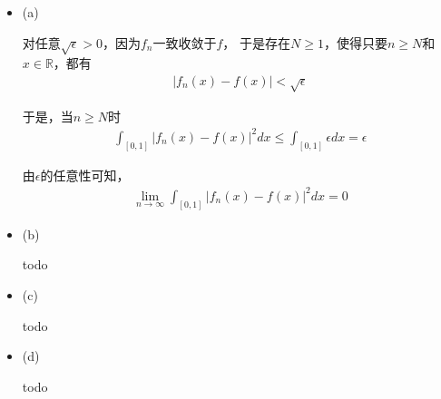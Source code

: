 \documentclass{article}
\begin{document}
\begin{itemize}
  \item (a)

        对任意$\sqrt{\epsilon} > 0$，因为$f_n$一致收敛于$f$，
        于是存在$N \geq 1$，使得只要$n \geq N$和$x \in \mathbb{R}$，都有
        \begin{align*}
          |f_n(x) - f(x)| < \sqrt{\epsilon}
        \end{align*}

        于是，当$n \geq N$时
        \begin{align*}
          \int_{[0, 1]} |f_n(x) - f(x)|^2 dx \leq \int_{[0, 1]} \epsilon dx = \epsilon
        \end{align*}

        由$\epsilon$的任意性可知，
        \begin{align*}
          \lim\limits_{n \to \infty} \int_{[0, 1]} |f_n(x) - f(x)|^2 dx = 0
        \end{align*}

  \item (b)

        todo

  \item (c)

        todo

  \item (d)

        todo

\end{itemize}
\end{document}
